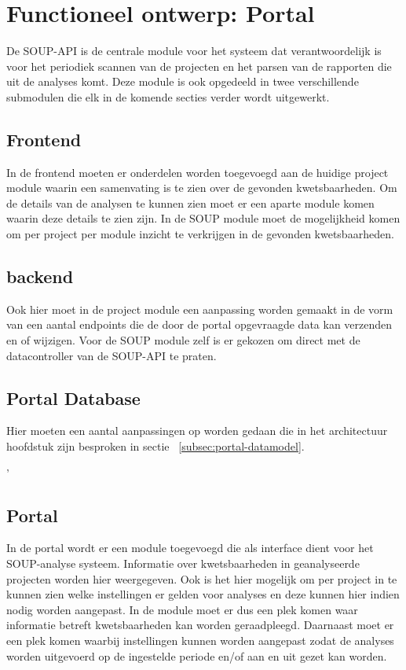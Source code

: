 \chapter{Functioneel ontwerp: Portal}\label{ch:impl-Portal}
De SOUP-API is de centrale module voor het systeem dat verantwoordelijk is voor het periodiek scannen van de projecten en het parsen van de rapporten die uit de analyses komt. Deze module is ook opgedeeld in twee verschillende submodulen die elk in de komende secties verder wordt uitgewerkt.


\section{Frontend}
In de frontend moeten er onderdelen worden toegevoegd aan de huidige project module waarin een samenvating is te zien over de gevonden kwetsbaarheden. Om de details van de analysen te kunnen zien moet er een aparte module komen waarin deze details te zien zijn. In de SOUP module moet de mogelijkheid komen om per project per module inzicht te verkrijgen in de gevonden kwetsbaarheden.


\section{backend}
Ook hier moet in de project module een aanpassing worden gemaakt in de vorm van een aantal endpoints die de door de portal opgevraagde data kan verzenden en of wijzigen. Voor de SOUP module zelf is er gekozen om direct met de datacontroller van de SOUP-API te praten.

\section{Portal Database}
Hier moeten een aantal aanpassingen op worden gedaan die in het architectuur hoofdstuk zijn besproken in sectie ~\ref{subsec:portal-datamodel}.


'


\section{Portal}\label{sec:portal}
In de portal wordt er een module toegevoegd die als interface dient voor het SOUP-analyse systeem. Informatie over kwetsbaarheden in geanalyseerde projecten worden hier weergegeven. Ook is het hier mogelijk om per project in te kunnen zien welke instellingen er gelden voor analyses en deze kunnen hier indien nodig worden aangepast.
In de module moet er dus een plek komen waar informatie betreft kwetsbaarheden kan worden geraadpleegd. Daarnaast moet er een plek komen waarbij instellingen kunnen worden aangepast zodat de analyses worden uitgevoerd op de ingestelde periode en/of aan en uit gezet kan worden.
